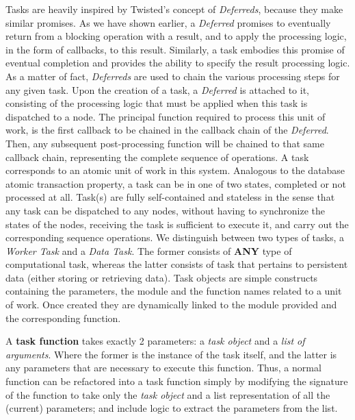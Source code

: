 \documentclass[12pt, titlepage]{uo_temp}
\begin{document}
     Tasks are heavily inspired by Twisted's concept of \emph{Deferreds}, because they
     make similar promises. As we have shown earlier, a \emph{Deferred} promises to
     eventually return from a blocking operation with a result, and to apply the
     processing logic, in the form of callbacks, to this result. Similarly, a task
     embodies this promise of eventual completion and provides the ability to specify the
     result processing logic. As a matter of fact, \emph{Deferreds} are used to chain the
     various processing steps for any given task. Upon the creation of a task, a
     \emph{Deferred} is attached to it, consisting of the processing logic that must be
     applied when this task is dispatched to a node. The principal function required to
     process this unit of work, is the first callback to be chained in the callback chain
     of the \emph{Deferred}. Then, any subsequent post-processing function will be chained
     to that same callback chain, representing the complete sequence of operations.
     A task corresponds to an atomic unit of work in this system. Analogous to the
     database atomic transaction property, a task can be in one of two states, completed
     or not processed at all. Task(s) are fully self-contained and stateless in the sense
     that any task can be dispatched to any nodes, without having to synchronize the
     states of the nodes, receiving the task is sufficient to execute it, and carry out
     the corresponding sequence operations. We distinguish between two types of tasks, a
     \emph{Worker Task} and a \emph{Data Task}. The former consists of \textbf{ANY} type
     of computational task, whereas the latter consists of task that pertains to
     persistent data (either storing or retrieving data).
     Task objects are simple constructs containing the parameters, the module and the
     function names related to a unit of work. Once created they are dynamically linked to
     the module provided and the corresponding function.

     A \textbf{task function} takes exactly 2 parameters: a \emph{task object} and a
     \emph{list of arguments}. Where the former is the instance of the task itself, and
     the latter is any parameters that are necessary to execute this function. Thus, a
     normal function can be refactored into a task function simply by modifying the
     signature of the function to take only the \emph{task object} and a list
     representation of all the (current) parameters; and include logic to extract the
     parameters from the list.
\end{document}
